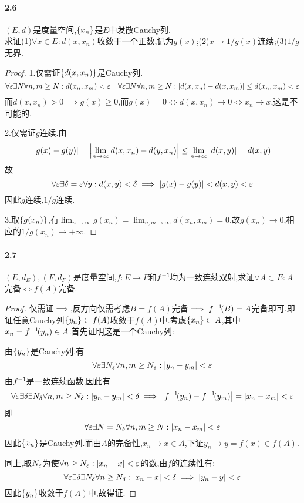 \documentclass[UTF8]{article}
\begin{document}
\paragraph*{2.6}$(E,d)$是度量空间,$\left\{x_n\right\}$是$E$中发散Cauchy列.\\
求证(1)$\forall x\in E:d(x,x_n)$收敛于一个正数,记为$g(x)$;(2)$x\mapsto 1/g(x)$连续;(3)$1/g$无界.
\begin{proof}
    1.仅需证$\left\{d(x,x_n)\right\}$是Cauchy列.$$\forall \varepsilon \exists N\forall n,m\geq N: d(x_n,x_m)<\varepsilon\quad \forall \varepsilon \exists N\forall n,m\geq N: \left|d(x,x_n)-d(x,x_m)\right|\leq d(x_n,x_m)<\varepsilon$$
    而$d(x,x_n)>0\implies g(x)\geq 0$,而$g(x)=0\iff d(x,x_n)\to 0\iff x_n\to x$,这是不可能的.

    2.仅需证$g$连续.由$$\left|g(x)-g(y)\right|=\left|\lim_{n\to \infty}d(x,x_n)-d(y,x_n)\right|\leq \lim_{n\to\infty}\left|d(x,y)\right|=d(x,y)$$故$$\forall \varepsilon\exists \delta=\varepsilon\forall y:d(x,y)<\delta\implies \left|g(x)-g(y)\right|<d(x,y)<\varepsilon$$因此$g$连续,$1/g$连续.

    3.取$\left\{g(x_n)\right\}$,有$ \lim_{n\to \infty}g(x_n)=\lim_{n,m\to\infty}d(x_n,x_m)=0$,故$g(x_n)\to 0$,相应的$1/g(x_n)\to +\infty$.
\end{proof}

\paragraph*{2.7}$(E,d_E),(F,d_F)$是度量空间,$f:E\to F$和$f^{-1}\!$均为一致连续双射,求证$\forall A\subset E:A$完备$\iff f(A)$完备.
\begin{proof}
    仅需证$\implies$,反方向仅需考虑$B=f(A)$完备$\implies f^{-1}\!(B)=A$完备即可.即证任意Cauchy列$\left\{y_n\right\}\subset f(A)$收敛于$f(A)$中.考虑$\left\{x_n\right\}\subset A$,其中$x_n=f^{-1}\!(y_n)\in A$.首先证明这是一个Cauchy列:
    
    由$\left\{y_n\right\}$是Cauchy列,有$$\forall \varepsilon\exists N_\varepsilon\forall n,m\geq N_\varepsilon:\left|y_n-y_m\right|<\varepsilon$$
    由$f^{-1}\!$是一致连续函数,因此有
    $$\forall \varepsilon\exists\delta\exists N_\delta\forall n,m\geq N_\delta:\left|y_n-y_m\right|<\delta\implies \left|f^{-1}\!(y_n)-f^{-1}\!(y_m)\right|=\left|x_n-x_m\right|<\varepsilon$$
    即$$\forall \varepsilon\exists N=N_\delta\forall n,m\geq N:\left|x_n-x_m\right|<\varepsilon$$
    因此$\left\{x_n\right\}$是Cauchy列.而由$A$的完备性,$x_n\to x\in A$,下证$y_n\to y=f(x)\in f(A)$.
    
    同上,取$N_\varepsilon$为使$\forall n\geq N_\varepsilon:\left|x_n-x\right|<\varepsilon$的数,由$f$的连续性有:
    $$\forall \varepsilon\exists \delta \exists N_\delta \forall n\geq N_\delta:\left|x_n-x\right|<\delta\implies \left|y_n-y\right|<\varepsilon$$
    因此$\left\{y_n\right\}$收敛于$f(A)$中,故得证.
\end{proof}
\end{document}
